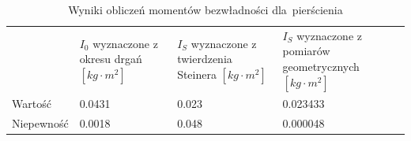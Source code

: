 \documentclass{fizraport}
\begin{document}
\begin{table}[h]
 \caption{ Wyniki obliczeń momentów bezwładności dla~pierścienia}
\centering
\begin{tabular}{|l|l|l|l|}
\hline
           & \multirow[t]{4}{0.2\linewidth}{$I_0$ wyznaczone z okresu drgań $\left[kg\cdot m^2\right]$} 
           & \multirow[t]{4}{0.2\linewidth}{$I_S$ wyznaczone z twierdzenia Steinera $\left[kg\cdot m^2\right]$ }
           & \multirow[t]{4}{0.2\linewidth}{$I_S$ wyznaczone z pomiarów geometrycznych $\left[kg\cdot m^2\right]$} \\&&&\\&&&\\&&&\\ \hline
Wartość    & 0.0431   & 0.023                                                                & 0.023433                                                                  \\ \hline
Niepewność & 0.0018   & 0.048                                                                & 0.000048                                                                  \\ \hline          
\end{tabular}
\end{table}
 
\end{document}

